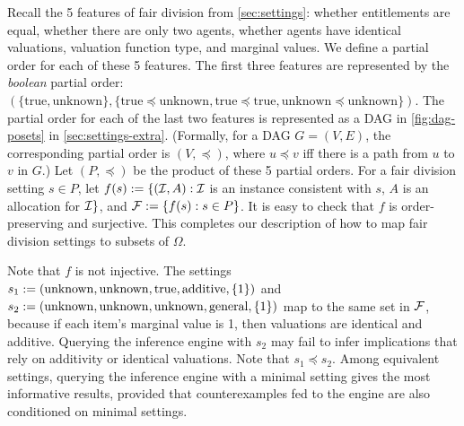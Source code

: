 Recall the 5 features of fair division from \cref{sec:settings}:
whether entitlements are equal,
whether there are only two agents,
whether agents have identical valuations,
valuation function type,
and marginal values.
%
We define a partial order for each of these 5 features.
The first three features are represented by the \emph{boolean} partial order:
$(\{\mathrm{true},\allowbreak \mathrm{unknown}\},
\{\mathrm{true} \preceq \mathrm{unknown},\allowbreak
\mathrm{true} \preceq \mathrm{true},\allowbreak
\mathrm{unknown} \preceq \mathrm{unknown}\})$.
The partial order for each of the last two features is
represented as a DAG in \cref{fig:dag-posets} in \cref{sec:settings-extra}.
(Formally, for a DAG $G = (V, E)$, the corresponding partial order is $(V, \preceq)$,
where $u \preceq v$ iff there is a path from $u$ to $v$ in $G$.)
%
Let $(P, \preceq)$ be the product of these 5 partial orders.
%
For a fair division setting $s \in P$, let
$f(s) := \{(\mathcal{I}, A): \mathcal{I}$ is an instance consistent with $s$,
$A$ is an allocation for $\mathcal{I}\}$, and $\mathcal{F} := \{f(s): s \in P\}$.
It is easy to check that $f$ is order-preserving and surjective.
This completes our description of how to map fair division settings to subsets of $\Omega$.

Note that $f$ is not injective. The settings
$s_1 := (\mathrm{unknown},\allowbreak \mathrm{unknown},\allowbreak \mathrm{true},\allowbreak \mathrm{additive},\allowbreak \{1\})$
and $s_2 := (\mathrm{unknown},\allowbreak \mathrm{unknown},\allowbreak \mathrm{unknown},\allowbreak \mathrm{general},\allowbreak \{1\})$
map to the same set in $\mathcal{F}$, because if
each item's marginal value is 1, then valuations are identical and additive.
Querying the inference engine with $s_2$
may fail to infer implications that rely on additivity or identical valuations.
Note that $s_1 \preceq s_2$.
Among equivalent settings, querying the inference engine with a minimal setting
gives the most informative results, provided that counterexamples fed to the engine
are also conditioned on minimal settings.
